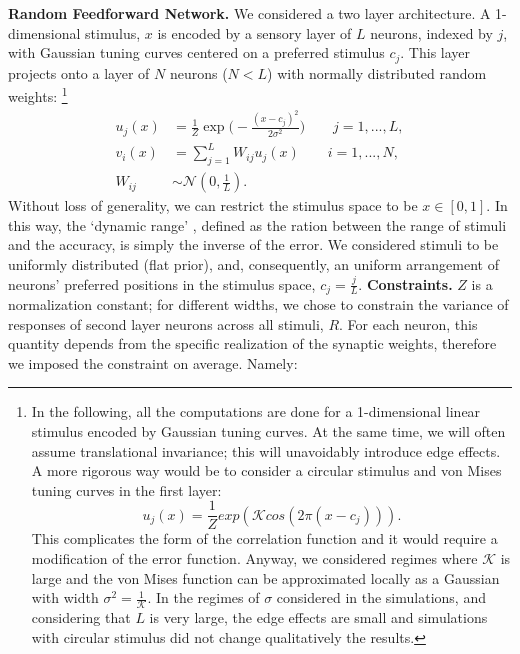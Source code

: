 \documentclass[a4paper]{article}%
\begin{document}
\textbf{Random Feedforward Network.} We considered a two layer architecture. A
1-dimensional stimulus, $x$ is encoded by a sensory layer of $L$ neurons,
indexed by $j$, with Gaussian tuning curves centered on a preferred stimulus
$c_{j}$. This layer projects onto a layer of $N$ neurons ($N<L$) with normally
distributed random weights: \footnote{In the following, all the computations
are done for a 1-dimensional linear stimulus encoded by Gaussian tuning
curves. At the same time, we will often assume translational invariance; this
will unavoidably introduce edge effects. A more rigorous way would be to
consider a circular stimulus and von Mises tuning curves in the first layer:
\[
u_{j}(x) = \frac{1}{Z} exp(\mathcal{K} cos(2\pi(x-c_{j}))).
\]
This complicates the form of the correlation function and it would require a
modification of the error function. Anyway, we considered regimes where
$\mathcal{K}$ is large and the von Mises function can be approximated locally
as a Gaussian with width $\sigma^{2} = \frac{1}{\mathcal{K}}$. In the regimes
of $\sigma$ considered in the simulations, and considering that $L$ is very
large, the edge effects are small and simulations with circular stimulus did
not change qualitatively the results.}
\begin{equation}%
\begin{split}
u_{j}(x)  & = \frac{1}{Z} \exp\Big(-\frac{(x-c_{j})^{2}}{2 \sigma^{2}%
}\Big) \qquad j = 1,...,L,\\
v_{i}(x)  & =\sum_{j=1}^{L} W_{ij} u_{j}(x) \qquad i =1,...,N,\\
W_{ij}  &  \sim\mathcal{N}(0,\frac{1}{L}).
\end{split}
\label{Eq:RFFN}%
\end{equation}
Without loss of generality, we can restrict the stimulus space to be
$x\in[0,1]$. In this way, the `dynamic range' , defined as the ration between
the range of stimuli and the accuracy, is simply the inverse of the error. We
considered stimuli to be uniformly distributed (flat prior), and,
consequently, an uniform arrangement of neurons' preferred positions in the
stimulus space, $c_{j} = \frac{j}{L}$. \newline\newline\textbf{Constraints.}
$Z$ is a normalization constant; for different widths, we chose to constrain
the variance of responses of second layer neurons across all stimuli, $R$. For
each neuron, this quantity depends from the specific realization of the
synaptic weights, therefore we imposed the constraint on average. Namely:
\end{document}

